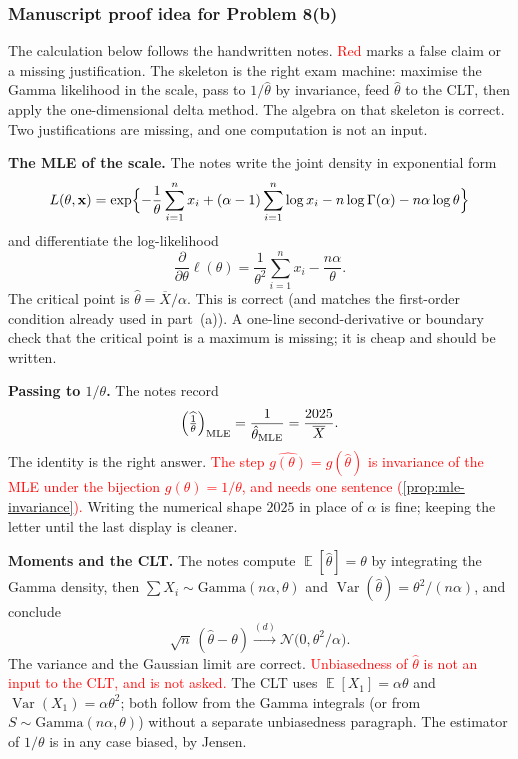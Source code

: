\documentclass[11pt,a4paper]{article}
\newcommand{\mserr}[1]{\textcolor{red}{#1}}
\DeclareMathOperator{\Var}{Var}
\DeclareMathOperator{\E}{\mathbb{E}}
\begin{document}
\subsubsection{Manuscript proof idea for Problem 8(b)}

The calculation below follows the handwritten notes. \mserr{Red} marks a false claim or a missing justification. The skeleton is the right exam machine: maximise the Gamma likelihood in the scale, pass to \( 1/\hat{\theta} \) by invariance, feed \( \hat{\theta} \) to the CLT, then apply the one-dimensional delta method. The algebra on that skeleton is correct. Two justifications are missing, and one computation is not an input.

\textbf{The MLE of the scale.}
The notes write the joint density in exponential form
\[
L(\theta,\mathbf{x})
=
\exp\Bigl\{
-\frac{1}{\theta}\sum_{i=1}^{n}x_i
+
(\alpha-1)\sum_{i=1}^{n}\log x_i
-
n\log\Gamma(\alpha)
-
n\alpha\log\theta
\Bigr\}
\]
and differentiate the log-likelihood
\[
\frac{\partial}{\partial\theta}\ell(\theta)
=
\frac{1}{\theta^{2}}\sum_{i=1}^{n}x_i
-
\frac{n\alpha}{\theta}.
\]
The critical point is \( \hat{\theta}=\overline{X}/\alpha \). This is correct (and matches the first-order condition already used in part~(a)). A one-line second-derivative or boundary check that the critical point is a maximum is missing; it is cheap and should be written.

\textbf{Passing to \( 1/\theta \).}
The notes record
\[
\Bigl(\widehat{\tfrac{1}{\theta}}\Bigr)_{\mathrm{MLE}}
=
\frac{1}{\hat{\theta}_{\mathrm{MLE}}}
=
\frac{2025}{\overline{X}}.
\]
The identity is the right answer. \mserr{The step \( \widehat{g(\theta)}=g(\hat{\theta}) \) is invariance of the MLE under the bijection \( g(\theta)=1/\theta \), and needs one sentence (\cref{prop:mle-invariance}).} Writing the numerical shape \( 2025 \) in place of \( \alpha \) is fine; keeping the letter until the last display is cleaner.

\textbf{Moments and the CLT.}
The notes compute \( \E[\hat{\theta}]=\theta \) by integrating the Gamma density, then \( \sum X_i\sim\mathrm{Gamma}(n\alpha,\theta) \) and \( \Var(\hat{\theta})=\theta^{2}/(n\alpha) \), and conclude
\[
\sqrt{n}\,(\hat{\theta}-\theta)
\xrightarrow{(d)}
\mathcal{N}\bigl(0,\theta^{2}/\alpha\bigr).
\]
The variance and the Gaussian limit are correct. \mserr{Unbiasedness of \( \hat{\theta} \) is not an input to the CLT, and is not asked.} The CLT uses \( \E[X_1]=\alpha\theta \) and \( \Var(X_1)=\alpha\theta^{2} \); both follow from the Gamma integrals (or from \( S\sim\mathrm{Gamma}(n\alpha,\theta) \)) without a separate unbiasedness paragraph. The estimator of \( 1/\theta \) is in any case biased, by Jensen.
\end{document}
